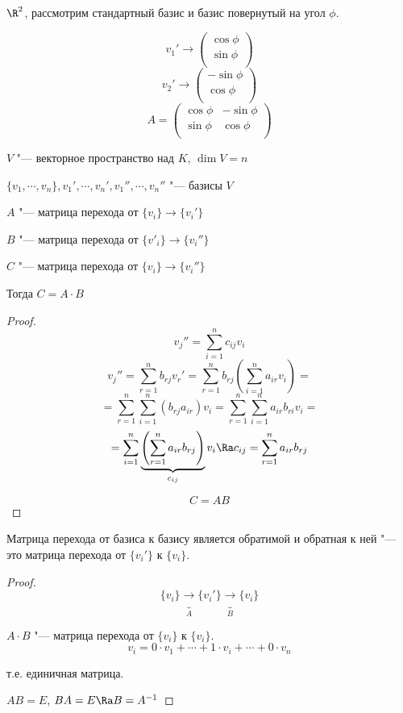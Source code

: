 \begin{exmp}
$\R^2$, рассмотрим стандартный базис и базис повернутый на угол $\phi$.

$$v_1' \to
\begin{pmatrix}
\cos \phi\\
\sin \phi\\
\end{pmatrix}$$
$$v_2' \to
\begin{pmatrix}
-\sin \phi\\
\cos \phi\\
\end{pmatrix}$$
$$
A =
\begin{pmatrix}
\cos \phi & -\sin \phi\\
\sin \phi & \cos \phi\\
\end{pmatrix} 
$$
\end{exmp}

\begin{theorem}
$V$ "--- векторное пространство над $K$, $\dim V = n$

$\{v_1, \cdots, v_n\}, {v_1', \cdots, v_n'}, {v_1'', \cdots, v_n''}$  "---
базисы $V$

$A$ "--- матрица перехода от $\{v_i\} \to \{v_i'\}$

$B$ "--- матрица перехода от $\{v'_i\} \to \{v_i''\}$

$C$ "--- матрица перехода от $\{v_i\} \to \{v_i''\}$

Тогда $C = A \cdot B$ 
\end{theorem}

\begin{proof}
$$v_j'' = \sum_{i = 1}^{n}c_{ij}v_i$$
$$v_j'' = \sum_{r = 1}^{n}b_{rj}v_r' = \sum_{r = 1}^{n}b_{rj}\left(\sum_{i = 1}^{n}a_{ir}v_i\right) =$$
$$=\sum_{r = 1}^{n}\sum_{i = 1}^{n}(b_{rj}a_{ir})v_i = \sum_{r = 1}^{n}\sum_{i = 1}^{n}a_{ir}b_{ri}v_i =$$
$$= \sum_{i = 1}^{n}\underbrace{\left(\sum_{r = 1}^{n}a_{ir} b_{rj}\right)}_{c_{ij}} v_i \Ra c_{ij} = \sum_{r = 1}^{n}a_{ir}b_{rj} $$

$$C = AB$$
\end{proof}

\begin{conseq}
Матрица перехода от базиса к базису 
является обратимой и обратная к ней "--- это матрица перехода от 
$\{v_i'\}$ к $\{v_i\}$.
\end{conseq}
\begin{proof}
$$\{v_i\} \underbrace{\to}_{A} \{v_i'\} \underbrace {\to}_{B} \{v_i\}$$

$A \cdot B$ "--- матрица перехода от $\{v_i\}$ к $\{v_i\}$.
$$v_i = 0\cdot v_1 + \cdots + 1\cdot v_i + \cdots + 0\cdot v_n$$

т.е. единичная матрица. 

$AB = E$, $BA = E \Ra B = A^{-1}$
\end{proof}

